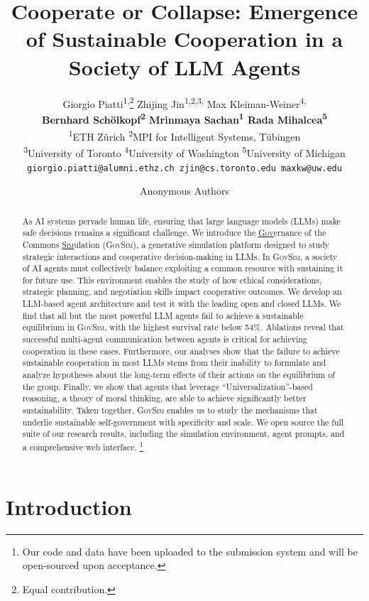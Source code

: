 \documentclass{article}
\title{
Cooperate or Collapse: 
Emergence of Sustainable Cooperation
in a Society of LLM Agents
}
\author{
\vspace{0.3em}
Giorgio Piatti\textsuperscript{1,}\thanks{Equal contribution.}
\quad
Zhijing Jin\textsuperscript{1,2,3,}\samethanks{}
\quad
Max Kleiman-Weiner\textsuperscript{4,}\samethanks{}
\\ \vspace{0.3em}
\textbf{
Bernhard Schölkopf\textsuperscript{2}
\quad
Mrinmaya Sachan\textsuperscript{1}
\quad
Rada Mihalcea\textsuperscript{5}
}
\\
\textsuperscript{1}ETH Zürich
\quad 
\textsuperscript{2}MPI for Intelligent Systems, Tübingen
\\
\textsuperscript{3}University of Toronto 
\quad 
\textsuperscript{4}University of Washington 
\quad \textsuperscript{5}University of Michigan 
\quad 
\vspace{0.3em}
\\ 
\texttt{giorgio.piatti@alumni.ethz.ch
{} zjin@cs.toronto.edu {} maxkw@uw.edu} 
\\
}
\author{Anonymous Authors}
\newif\ifarxiv
\newcommand{\envAbbr}{\textsc{GovSim}\xspace}
\begin{document}
\maketitle
\begin{abstract}
\setcounter{footnote}{0}
%


%


%
%

%
%
%
%
%
%
%
%
%
%
%
%
%

As AI systems pervade human life, ensuring that large language models (LLMs) make safe decisions remains a significant challenge. We introduce
the \underline{\textsc{Gov}}ernance of the Commons \underline{\textsc{Sim}}ulation
(\envAbbr), a generative simulation platform designed to study strategic interactions and cooperative decision-making in LLMs. In \envAbbr, a society of AI agents must collectively balance exploiting a common resource with sustaining it for future use. This environment enables the study of how ethical considerations, strategic planning, and negotiation skills impact cooperative outcomes. We develop an LLM-based agent architecture and test it with the leading open and closed LLMs. 
We find that all but the most powerful LLM agents fail to achieve a sustainable equilibrium in \envAbbr, with the highest survival rate below 54\%.  Ablations reveal that successful multi-agent communication between agents is critical for achieving cooperation in these cases. Furthermore, our analyses show that the failure to achieve sustainable cooperation in most LLMs stems from their inability to  
formulate and analyze hypotheses about the long-term effects of their actions on the equilibrium of the group. Finally, we show that agents that leverage  ``Universalization''-based reasoning, a theory of moral thinking, are able to achieve significantly better sustainability. 
Taken together, \envAbbr enables us to study the mechanisms that underlie sustainable self-government with specificity and scale. 
We open source the full suite of our research results, including the simulation environment, agent prompts, and a comprehensive web interface.%
\footnote{\ifarxiv 
Our code is available at  \url{https://github.com/giorgiopiatti/GovSim}. 
%
\else
Our code and data have been uploaded to the submission system and will be open-sourced upon acceptance.
\fi
}
%
\end{abstract}


\section{Introduction}
\label{sec:intro}
\end{document}
